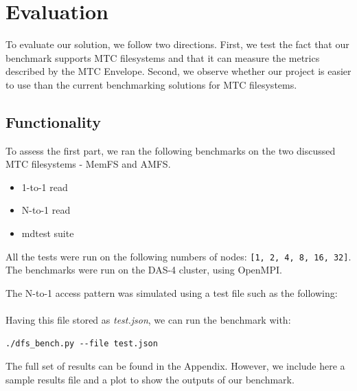
\chapter{Evaluation} %

\label{Chapter4} %


To evaluate our solution, we follow two directions. First, we test the fact that our benchmark supports MTC filesystems and that it can measure the metrics described by the MTC Envelope. Second, we observe whether our project is easier to use than the current benchmarking solutions for MTC filesystems.

\section{Functionality}

To assess the first part, we ran the following benchmarks on the two discussed MTC filesystems - MemFS and AMFS.

\begin{itemize}

\item 1-to-1 read
\item N-to-1 read
\item mdtest suite

\end{itemize}

All the tests were run on the following numbers of nodes: \texttt{[1, 2, 4, 8, 16, 32]}. The benchmarks were run on the DAS-4 cluster, using OpenMPI.

The N-to-1 access pattern was simulated using a test file such as the following:\\\\



Having this file stored as \textit{test.json}, we can run the benchmark with:

\begin{verbatim}
./dfs_bench.py --file test.json
\end{verbatim}

The full set of results can be found in the Appendix. However, we include here a sample results file and a plot to show the outputs of our benchmark.

